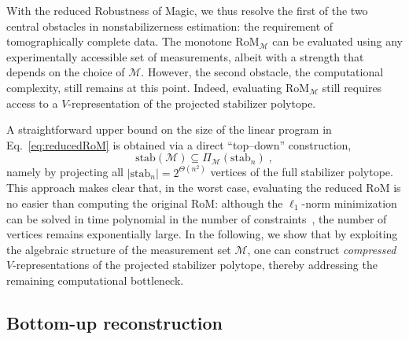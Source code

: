 \documentclass[10pt,aps,pra,twocolumn,floatfix,nofootinbib,superscriptaddress,longbibliography]{revtex4-2}
\newcommand{\1}{\mathbbm{1}}
\begin{document}
With the reduced Robustness of Magic, we thus resolve the first of the two central obstacles in nonstabilizerness estimation: the requirement of tomographically complete data. The monotone $\mathrm{RoM}_\mathcal M$ can be evaluated using any experimentally accessible set of measurements, albeit with a strength that depends on the choice of $\mathcal M$. However, the second obstacle, the computational complexity, still remains at this point. Indeed, evaluating $\mathrm{RoM}_\mathcal M$ still requires access to a $V$-representation of the projected stabilizer polytope.

A straightforward upper bound on the size of the linear program in Eq.~\eqref{eq:reducedRoM} is obtained via a direct ``top--down'' construction,
\begin{equation}
    \mathrm{stab}(\mathcal M) \subseteq \Pi_\mathcal M(\mathrm{stab}_n)\;,
    \label{eq:topdownVrep}
\end{equation}
namely by projecting all $|\mathrm{stab}_n| = 2^{\Theta(n^2)}$ vertices of the full stabilizer polytope. This approach makes clear that, in the worst case, evaluating the reduced RoM is no easier than computing the original RoM: although the $\ell_1$-norm minimization can be solved in time polynomial in the number of constraints~\cite{vaidya1989speeding}, the number of vertices remains exponentially large. In the following, we show that by exploiting the algebraic structure of the measurement set $\mathcal M$, one can construct \emph{compressed} $V$-representations of the projected stabilizer polytope, thereby addressing the remaining computational bottleneck.


\subsection{Bottom-up reconstruction}
\end{document}
